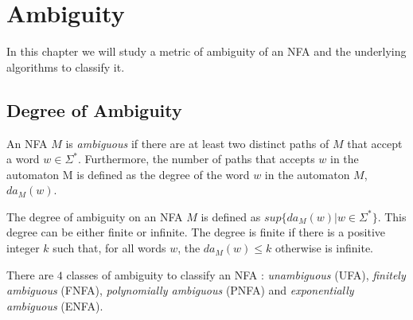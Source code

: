 \chapter{Ambiguity}
In this chapter we will study a metric of ambiguity of an NFA and the underlying algorithms to classify it.

\section{Degree of Ambiguity}

An NFA $M$ is \emph{ambiguous} if there are at least two distinct paths of $M$ that accept a word $w \in \Sigma^*$. Furthermore, the number of paths that accepts $w$ in the automaton M is defined as the degree of the word $w$ in the automaton $M$, $da_M(w)$.

The degree of ambiguity on an NFA $M$ is defined as $sup\{da_M(w) | w \in \Sigma^*\}$. This degree can be either finite or infinite. The degree is finite if there is a positive integer $k$ such that, for all words $w$, the $da_M(w) \leq k$ otherwise is infinite.

There are $4$ classes of ambiguity to classify an NFA \cite{Seidl89}: \emph{unambiguous} (UFA), \emph{finitely ambiguous} (FNFA), \emph{polynomially ambiguous} (PNFA) and \emph{exponentially ambiguous} (ENFA).

